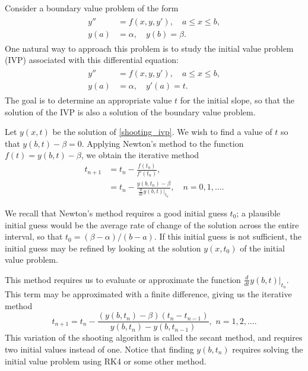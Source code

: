 \label{lab:Shooting}

Consider a boundary value problem of the form 
\begin{align}
	\label{shooting_bvp}
	\begin{split}
y'' &= f(x,y,y'), \quad a \leq x \leq b, \\
y(a) &= \alpha, \quad y(b) = \beta. 
\end{split}
\end{align}
One natural way to approach this problem is to study the initial value problem (IVP) associated with this differential equation: 
\begin{align}
	\label{shooting_ivp}
	\begin{split}
y'' &= f(x,y,y'), \quad a \leq x \leq b, \\
y(a) &= \alpha, \quad y'(a) = t. 
	\end{split}
\end{align}
The goal is to determine an  appropriate value $t$ for the initial slope, so that the solution of the IVP is also a solution of the boundary value problem. 

Let $y(x,t)$ be the solution of \eqref{shooting_ivp}. We wish to find a value of $t$ so that 
$y(b,t) - \beta = 0$. 
Applying Newton's method to the function $f(t) = y(b,t) - \beta$, we obtain the iterative method 
\begin{align*}
	t_{n+1} &= t_n - \frac{ f(t_n)}{f'(t_n) }, \\
	&= t_n - \frac{ y(b,t_n) - \beta}{\frac{d}{dt} \left.y(b,t)\right|_{t_n} },\quad n = 0,1,\ldots .
\end{align*}

We recall that Newton's method requires a good initial guess $t_0$; a plausible initial guess would be the average rate of change of the solution across the entire interval, so that $t_0 =  (\beta - \alpha)/(b-a)$. If this initial guess is not sufficient, the initial guess may be refined by looking at the solution $y(x,t_0)$ of the initial value problem.

This method requires us to evaluate or approximate the function $\frac{d}{dt} \left.y(b,t)\right|_{t_n}$. This term may be approximated with a finite difference, giving us the iterative method
\[t_{n+1} = t_n - \frac{ (y(b,t_n) - \beta)(t_n - t_{n-1})}{y(b,t_n) - y(b,t_{n-1}) }, \,\, n = 1, 2,\hdots .\]
This variation of the shooting algorithm is called the secant method, and requires two initial values instead of one. Notice that finding $y(b,t_n)$ requires solving the initial value problem using RK4 or some other method.

